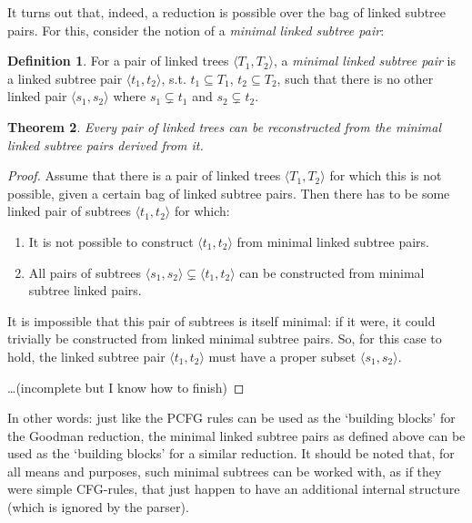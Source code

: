 \documentclass[a4paper]{article}
\newtheorem{theorem}{Theorem}[section]
\theoremstyle{definition}
\newtheorem{definition}[theorem]{Definition}
\begin{document}
It turns out that, indeed, a reduction is possible over the bag of linked
subtree pairs. For this, consider the notion of a \emph{minimal linked subtree
pair}:

\begin{definition}
For a pair of linked trees $\langle T_1, T_2 \rangle$, a \emph{minimal linked
subtree pair} is a linked subtree pair $\langle t_1, t_2 \rangle$, s.t. $t_1
\subseteq T_1$, $t_2 \subseteq T_2$, such that there is no other linked pair
$\langle s_1, s_2 \rangle$ where $s_1 \subsetneq t_1$ and $s_2 \subsetneq t_2$.
\end{definition}

\begin{theorem}
Every pair of linked trees can be reconstructed from the minimal linked subtree
pairs derived from it.
\end{theorem}

\begin{proof}

Assume that there is a pair of linked trees $\langle T_1, T_2 \rangle$ for
which this is not possible, given a certain bag of linked subtree pairs. Then
there has to be some linked pair of subtrees $\langle t_1, t_2 \rangle$ for
which:

\begin{enumerate}
\item It is not possible to construct $\langle t_1, t_2 \rangle$ from minimal
	linked subtree pairs.
\item All pairs of subtrees $\langle s_1, s_2 \rangle \subsetneq \langle t_1,
	t_2 \rangle$ can be constructed from minimal subtree linked pairs.
\end{enumerate}

It is impossible that this pair of subtrees is itself minimal: if it were, it
could trivially be constructed from linked minimal subtree pairs. So, for this
case to hold, the linked subtree pair $\langle t_1, t_2 \rangle$ must have a
proper subset $\langle s_1, s_2 \rangle$.

\ldots (incomplete but I know how to finish)

\end{proof}

In other words: just like the PCFG rules can be used as the `building blocks'
for the Goodman reduction, the minimal linked subtree pairs as defined above
can be used as the `building blocks' for a similar reduction. It should be
noted that, for all means and purposes, such minimal subtrees can be worked
with, as if they were simple CFG-rules, that just happen to have an additional
internal structure (which is ignored by the parser).
\end{document}
